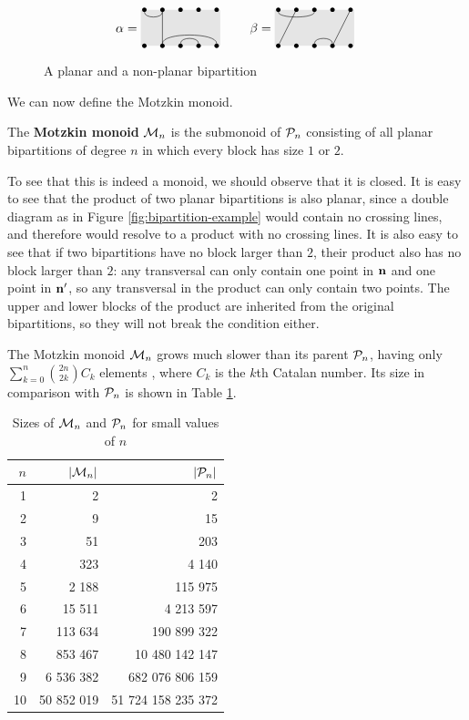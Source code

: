\begin{figure}[ht]
  \centering
  $$\alpha = \bipartdiag{\tc12\tv22\bC25 \bc34} \qquad
  \beta = \bipartdiag{\tc13 \tv21 \tv54\bc34}$$
  \caption{A planar and a non-planar bipartition}
  \label{fig:planar}
\end{figure}

We can now define the Motzkin monoid.

\begin{definition}
  \label{def:motzkin}
  The \textbf{Motzkin monoid} $\mathcal{M}_n$ is the submonoid of $\mathcal{P}_n$ consisting
  of all planar bipartitions of degree $n$ in which every block has size $1$ or
  $2$.
\end{definition}

To see that this is indeed a monoid, we should observe that it is closed.  It is
easy to see that the product of two planar bipartitions is also planar, since a
double diagram as in Figure \ref{fig:bipartition-example} would contain no
crossing lines, and therefore would resolve to a product with no crossing lines.
It is also easy to see that if two bipartitions have no block larger than $2$,
their product also has no block larger than $2$: any transversal can only
contain one point in $\mathbf{n}$ and one point in $\mathbf{n}'$, so any transversal in the
product can only contain two points.  The upper and lower blocks of the product
are inherited from the original bipartitions, so they will not break the
condition either.

The Motzkin monoid $\mathcal{M}_n$ grows much slower than its parent $\mathcal{P}_n$, having
only $\sum_{k=0}^n \binom{2n}{2k}C_k$ elements
, where $C_k$ is the $k$th
Catalan number.  Its size in comparison with $\mathcal{P}_n$ is shown in Table
\ref{tab:mn-size}.

\begin{table}[ht]
  \centering
  \renewcommand\arraystretch{1.0}
  \begin{tabular}{| r | r | r |}
    \hline
    $n$ & $|\mathcal{M}_n|$ & $|\mathcal{P}_n|$ \\
    \hline
     1 &           2 &                  2 \\
     2 &           9 &                 15 \\
     3 &          51 &                203 \\
     4 &         323 &              4 140 \\
     5 &       2 188 &            115 975 \\
     6 &      15 511 &          4 213 597 \\
     7 &     113 634 &        190 899 322 \\
     8 &     853 467 &     10 480 142 147 \\
     9 &   6 536 382 &    682 076 806 159 \\
    10 &  50 852 019 & 51 724 158 235 372 \\
    \hline
  \end{tabular}
  \renewcommand\arraystretch{0.7}
  \caption{Sizes of $\mathcal{M}_n$ and $\mathcal{P}_n$ for small values of $n$}
  \label{tab:mn-size}
\end{table}

